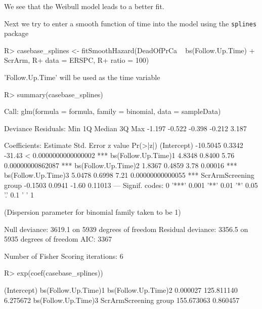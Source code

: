 \documentclass[article]{jss}
\begin{document}
We see that the Weibull model leads to a better fit.

Next we try to enter a smooth function of time into the model using the
\texttt{splines} package

\begin{CodeChunk}

\begin{CodeInput}
R> casebase_splines <- fitSmoothHazard(DeadOfPrCa ~ bs(Follow.Up.Time) + ScrArm, 
R+                                     data = ERSPC, 
R+                                     ratio = 100)
\end{CodeInput}

\begin{CodeOutput}
'Follow.Up.Time' will be used as the time variable
\end{CodeOutput}

\begin{CodeInput}
R> summary(casebase_splines)
\end{CodeInput}

\begin{CodeOutput}

Call:
glm(formula = formula, family = binomial, data = sampleData)

Deviance Residuals: 
   Min      1Q  Median      3Q     Max  
-1.197  -0.522  -0.398  -0.212   3.187  

Coefficients:
                      Estimate Std. Error z value             Pr(>|z|)    
(Intercept)           -10.5045     0.3342  -31.43 < 0.0000000000000002 ***
bs(Follow.Up.Time)1     4.8348     0.8400    5.76     0.00000000862087 ***
bs(Follow.Up.Time)2     1.8367     0.4859    3.78              0.00016 ***
bs(Follow.Up.Time)3     5.0478     0.6998    7.21     0.00000000000055 ***
ScrArmScreening group  -0.1503     0.0941   -1.60              0.11013    
---
Signif. codes:  0 '***' 0.001 '**' 0.01 '*' 0.05 '.' 0.1 ' ' 1

(Dispersion parameter for binomial family taken to be 1)

    Null deviance: 3619.1  on 5939  degrees of freedom
Residual deviance: 3356.5  on 5935  degrees of freedom
AIC: 3367

Number of Fisher Scoring iterations: 6
\end{CodeOutput}

\begin{CodeInput}
R> exp(coef(casebase_splines))
\end{CodeInput}

\begin{CodeOutput}
          (Intercept)   bs(Follow.Up.Time)1   bs(Follow.Up.Time)2 
             0.000027            125.811140              6.275672 
  bs(Follow.Up.Time)3 ScrArmScreening group 
           155.673063              0.860457 
\end{CodeOutput}


\end{CodeChunk}
\end{document}
